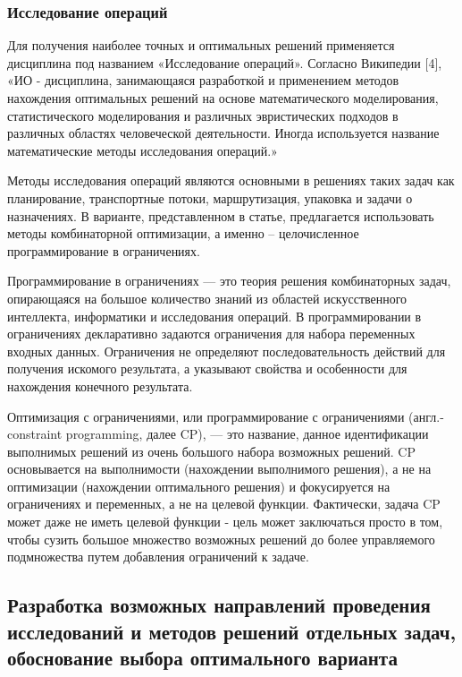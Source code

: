 \subsubsection{Исследование операций}

Для получения наиболее точных и оптимальных решений применяется дисциплина под названием «Исследование операций». Согласно Википедии [4], «ИО - дисциплина, занимающаяся разработкой и применением методов нахождения оптимальных решений на основе математического моделирования, статистического моделирования и различных эвристических подходов в различных областях человеческой деятельности. Иногда используется название математические методы исследования операций.»

Методы исследования операций являются основными в решениях таких задач как планирование, транспортные потоки, маршрутизация, упаковка и задачи о назначениях. В варианте, представленном в статье, предлагается использовать методы комбинаторной оптимизации, а именно – целочисленное программирование в ограничениях.

Программирование в ограничениях — это теория решения комбинаторных задач, опирающаяся на большое количество знаний из областей искусственного интеллекта, информатики и исследования операций. В программировании в ограничениях декларативно задаются ограничения для набора переменных входных данных. Ограничения не определяют последовательность действий для получения искомого результата, а указывают свойства и особенности для нахождения конечного результата. 

Оптимизация с ограничениями, или программирование с ограничениями (англ.- constraint programming, далее CP), — это название, данное идентификации выполнимых решений из очень большого набора возможных решений. CP основывается на выполнимости (нахождении выполнимого решения), а не на оптимизации (нахождении оптимального решения) и фокусируется на ограничениях и переменных, а не на целевой функции. Фактически, задача CP может даже не иметь целевой функции - цель может заключаться просто в том, чтобы сузить большое множество возможных решений до более управляемого подмножества путем добавления ограничений к задаче.

\subsection{Разработка возможных направлений проведения исследований и методов решений отдельных задач, обоснование выбора оптимального варианта}

